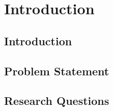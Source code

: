 
\chapter{Introduction}

\section{Introduction}



\section{Problem Statement}



\section{Research Questions}




